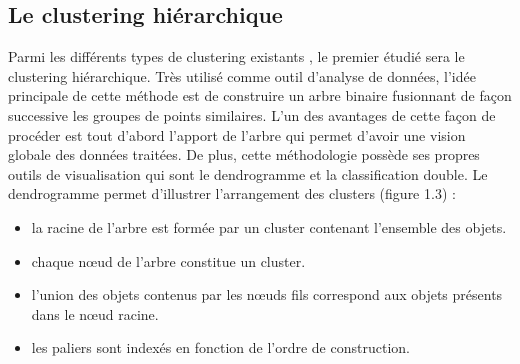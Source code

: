 \documentclass[memoire.tex]{subfiles}
\begin{document}
\subsection{Le clustering hiérarchique}
Parmi les différents types de clustering existants \cite{ref4}, le premier étudié sera le clustering hiérarchique. Très utilisé comme outil d'analyse de données, l'idée principale de cette méthode est de construire un arbre binaire fusionnant de façon successive les groupes de points similaires. L'un des avantages de cette façon de procéder  est tout d'abord l'apport de l'arbre qui permet d'avoir une vision globale des données traitées. De plus, cette méthodologie possède ses propres outils de visualisation qui sont le dendrogramme et la classification double. Le dendrogramme permet d'illustrer l'arrangement des clusters (figure 1.3)\cite{ref8} :
\begin{itemize}
\item la racine de l'arbre est formée par un cluster contenant l'ensemble des objets.
\item chaque nœud de l'arbre constitue un cluster.
\item l'union des objets contenus par les nœuds fils correspond aux objets présents dans le nœud racine.
\item les paliers sont indexés en fonction de l'ordre de construction.
\end{itemize}
\end{document}
